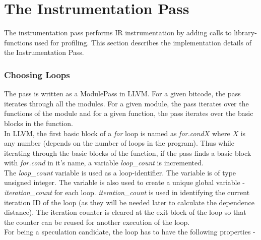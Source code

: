\documentclass[10pt]{report}          %
\begin{document}
\section{The Instrumentation Pass}
\label{sec:instrumentation_pass}

The instrumentation pass performs IR instrumentation by adding calls to library-functions used for profiling.  This section describes the implementation details of the Instrumentation Pass.

\subsubsection{Choosing Loops}

The pass is written as a ModulePass in LLVM.  For a given bitcode, the pass iterates through all the modules.  For a given module, the pass iterates over the functions of the module and for a given function, the pass iterates over the basic blocks in the function. \\
In LLVM, the first basic block of a \textit{for} loop is named as \textit{for.cond$X$} where $X$ is any number (depends on the number of loops in the program).  Thus while iterating through the basic blocks of the function, if the pass finds a basic block with \textit{for.cond} in it's name, a variable \textit{loop\_count} is incremented. \\
The \textit{loop\_count} variable is used as a loop-identifier.  The variable is of type unsigned integer.  The variable is also used to create a unique global variable - \textit{iteration\_count} for each loop.  \textit{iteration\_count} is used in identifying the current iteration ID of the loop (as they will be needed later to calculate the dependence distance).  The iteration counter is cleared at the exit block of the loop so that the counter can be reused for another execution of the loop. \\
For being a speculation candidate, the loop has to have the following properties -
\end{document}
